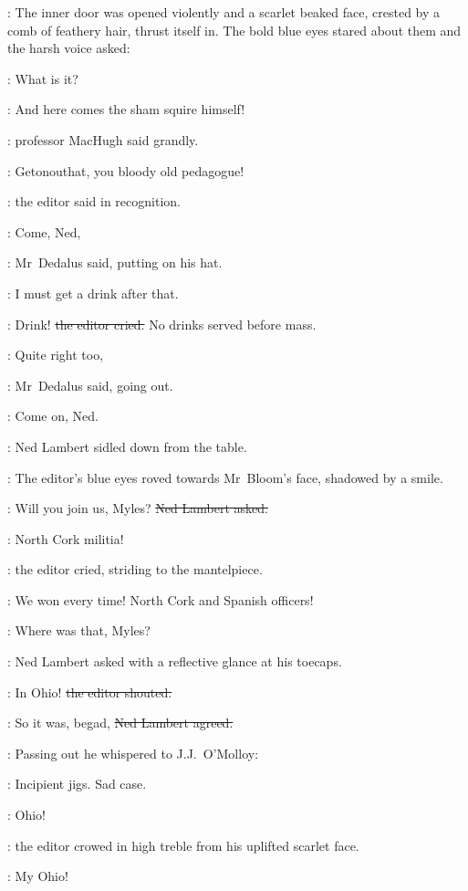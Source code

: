 :
The inner door was opened violently
and a scarlet beaked face,
crested by a comb of feathery hair,
thrust itself in.
The bold blue eyes stared about them
and the harsh voice asked:

\crawford:
What is it?

\machugh:
And here comes the sham squire himself!

:
professor MacHugh said grandly.

\crawford:
Getonouthat, you bloody old pedagogue!

:
the editor said in recognition.

\simon:
Come, Ned,

:
Mr~Dedalus said, putting on his hat.

\simon:
I must get a drink after that.

\crawford:
Drink!
\sout{the editor cried.}
No drinks served before mass.

\simon:
Quite right too,

:
Mr~Dedalus said, going out.

\simon:
Come on, Ned.

:
Ned Lambert sidled down from the table.

:
The editor's blue eyes roved towards Mr~Bloom's face,
shadowed by a smile.

\lambert:
Will you join us, Myles?
\sout{Ned Lambert asked.}



\crawford:
North Cork militia!

:
the editor cried,
striding to the mantelpiece.

\crawford:
We won every time!
North Cork and Spanish officers!

\lambert:
Where was that, Myles?

:
Ned Lambert asked with a reflective glance at his toecaps.

\crawford:
In Ohio!
\sout{the editor shouted.}

\lambert:
So it was, begad,
\sout{Ned Lambert agreed.}

:
Passing out he whispered to J.J.~O'Molloy:

\lambert:
Incipient jigs.
Sad case.

\crawford:
Ohio!

:
the editor crowed in high treble from his uplifted scarlet face.

\crawford:
My Ohio!

